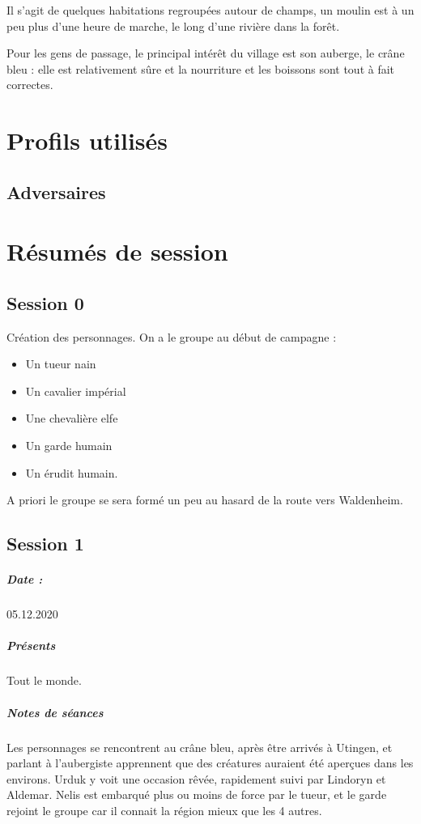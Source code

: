\documentclass[10pt,a4paper]{book}
\begin{document}
Il s'agit de quelques habitations regroupées autour de champs, un moulin est à un peu plus d'une heure de marche, le long d'une rivière dans la forêt. 

Pour les gens de passage, le principal intérêt du village est son auberge, le crâne bleu : elle est relativement sûre et la nourriture et les boissons sont tout à fait correctes.
\chapter{Profils utilisés}
\section{Adversaires}

\chapter{Résumés de session}
\section{Session 0}
Création des personnages. On a le groupe au début de campagne :
\begin{itemize}
\item Un tueur nain
\item Un cavalier impérial
\item Une chevalière elfe
\item Un garde humain
\item Un érudit humain.
\end{itemize}
A priori le groupe se sera formé un peu au hasard de la route vers Waldenheim.
\section{Session 1}
\paragraph{Date :}05.12.2020
\paragraph{Présents} Tout le monde.

\paragraph{Notes de séances}
Les personnages se rencontrent au crâne bleu, après être arrivés à Utingen, et parlant à l'aubergiste apprennent que des créatures auraient été aperçues dans les environs. Urduk y voit une occasion rêvée, rapidement suivi par Lindoryn et Aldemar. Nelis est embarqué plus ou moins de force par le tueur, et le garde rejoint le groupe car il connait la région mieux que les 4 autres.
\end{document}
